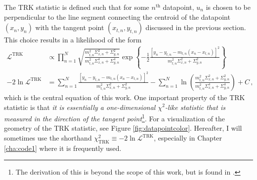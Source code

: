 The TRK statistic is defined such that for some $n^\text{th}$ datapoint, $u_n$ is chosen to be perpendicular to the line segment connecting the centroid of the datapoint $(x_n,y_n)$ with the tangent point $(x_{t,n},y_{t,n})$ discussed in the previous section. This choice results in a likelihood of the form
\begin{align}\label{eq:TRK}
\mathcal{L}^{\mathrm {TRK}} & \propto \prod_{n=1}^{N}{ \sqrt{\frac{m_{t,n}^2\Sigma_{x,n}^2+\Sigma_{y,n}^2}{m_{t,n}^2\Sigma_{x,n}^4+\Sigma_{y,n}^4}}\exp\left\{{-\frac{1}{2}\frac{\left[y_n-y_{t,n}-m_{t,n}(x_n-x_{t,n})\right]^2}{m_{t,n}^2\Sigma_{x,n}^2+\Sigma_{y,n}^2}}\right\}} \nonumber \\ -2\ln\mathcal{L}^{\mathrm{TRK}} &= \sum_{n=1}^{N}{\frac{\left[y_n-y_{t,n}-m_{t,n}(x_n-x_{t,n})\right]^2}{m_{t,n}^2\Sigma_{x,n}^2+\Sigma_{y,n}^2}} - \sum_{n=1}^{N}{\ln\left(\frac{m_{t,n}^2\Sigma_{x,n}^2+\Sigma_{y,n}^2}{m_{t,n}^2\Sigma_{x,n}^4+\Sigma_{y,n}^4}\right)} + C \, ,
\end{align}
which is the central equation of this work. One important property of the TRK statistic is that \textit{it is essentially a one-dimensional $\chi^2$-like statistic that is measured in the direction of the tangent point}\footnote{The derivation of this is beyond the scope of this work, but is found in \textcite{trotter}.}. For a visualization of the geometry of the TRK statistic, see Figure \ref{fig:datapointcolor}. Hereafter, I will sometimes use the shorthand  $\chi^2_\text{TRK}\equiv-2\ln\mathcal{L}^\text{TRK}$, especially in Chapter \ref{cha:code1} where it is frequently used.

